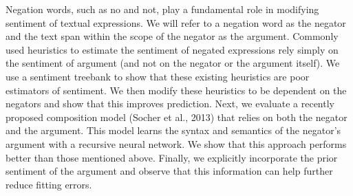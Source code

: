Negation words, such as no and not, play a fundamental role in modifying sentiment of textual expressions. We will refer to a negation word as the negator and the text span within the scope of the negator as the argument. Commonly used heuristics to estimate the sentiment of negated expressions rely simply on the sentiment of argument (and not on the negator or the argument itself). We use a sentiment treebank to show that these existing heuristics are poor estimators of sentiment. We then modify these heuristics to be dependent on the negators and show that this improves prediction. Next, we evaluate a recently proposed composition model (Socher et al., 2013) that relies on both the negator and the argument. This model learns the syntax and semantics of the negator's argument with a recursive neural network. We show that this approach performs better than those mentioned above. Finally, we explicitly incorporate the prior sentiment of the argument and observe that this information can help further reduce fitting errors.
